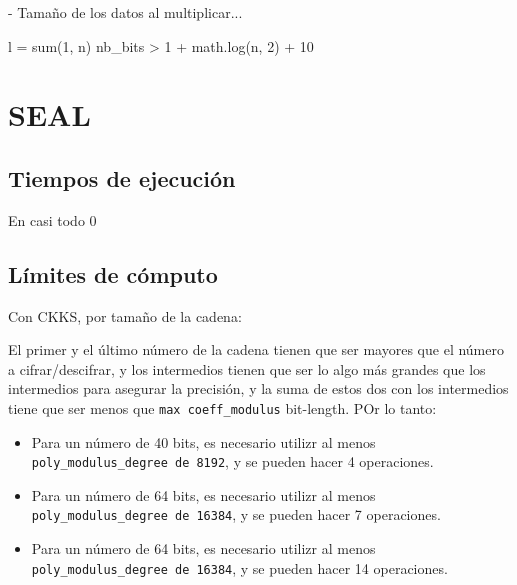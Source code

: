 - Tamaño de los datos al multiplicar...

l = sum(1, n)
nb_bits > 1 + math.log(n, 2) + 10

\section{SEAL}

\subsection{Tiempos de ejecución}

En casi todo 0


\subsection{Límites de cómputo}

Con CKKS, por tamaño de la cadena:

El primer y el último número de la cadena tienen que ser mayores que el número a cifrar/descifrar, y los intermedios tienen que ser lo algo más grandes  que los intermedios para asegurar la precisión, y la suma de estos dos con los intermedios tiene que ser menos que  \verb|max coeff_modulus| bit-length. POr lo tanto:

\begin{itemize}
    \item Para un número de 40 bits, es necesario utilizr al menos  \verb|poly_modulus_degree de 8192|, y se pueden hacer 4 operaciones.
    \item Para un número de 64 bits, es necesario utilizr al menos  \verb|poly_modulus_degree de 16384|, y se pueden hacer 7 operaciones.
    \item Para un número de 64 bits, es necesario utilizr al menos \verb|poly_modulus_degree de 16384|, y se pueden hacer 14 operaciones.
\end{itemize}

